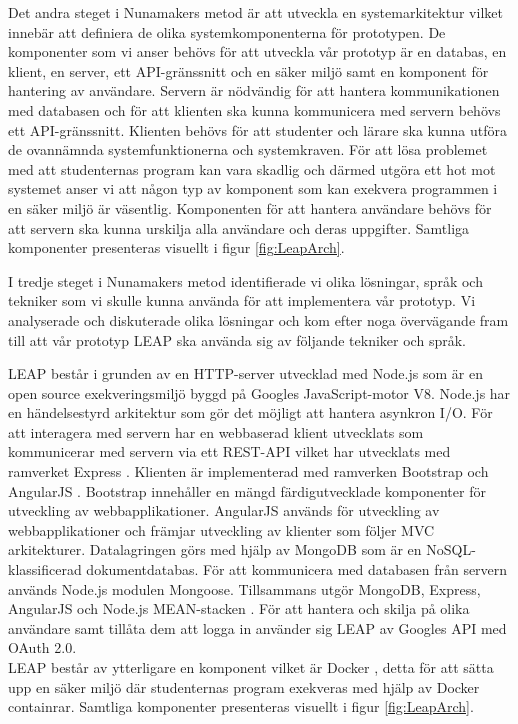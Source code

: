 \documentclass[a4paper,11pt]{article}
\begin{document}
{Det andra steget i Nunamakers metod är att utveckla en systemarkitektur vilket innebär att definiera de olika systemkomponenterna för prototypen. De komponenter som vi anser behövs för att utveckla vår prototyp är en databas,  en klient, en server, ett API-gränssnitt och en säker miljö samt en komponent för hantering av användare. Servern är nödvändig för att hantera kommunikationen med databasen och för att klienten ska kunna kommunicera med servern behövs ett API-gränssnitt. Klienten behövs för att studenter och lärare ska kunna utföra de ovannämnda systemfunktionerna och systemkraven. För att lösa problemet med att studenternas program kan vara skadlig och därmed utgöra ett hot mot systemet anser vi att någon typ av komponent som kan exekvera programmen i en säker miljö är väsentlig. Komponenten för att hantera användare behövs för att servern ska kunna urskilja alla användare och deras uppgifter. Samtliga komponenter presenteras visuellt i figur \ref{fig:LeapArch}.

I tredje steget i Nunamakers metod identifierade vi olika lösningar, språk och tekniker som vi skulle kunna använda för att implementera vår prototyp. Vi analyserade och diskuterade olika lösningar och kom efter noga övervägande fram till att vår prototyp LEAP ska använda sig av följande tekniker och språk. 

LEAP består i grunden av en HTTP-server utvecklad med Node.js \cite{nodejs} som är en open source exekveringsmiljö byggd på Googles JavaScript-motor V8. Node.js har en händelsestyrd arkitektur som gör det möjligt att hantera asynkron I/O. För att interagera med servern har en webbaserad klient utvecklats som kommunicerar med servern via ett REST-API vilket har utvecklats med ramverket Express \cite{express}. Klienten är implementerad med ramverken Bootstrap \cite{bootstrap} och AngularJS \cite{angularjs}. Bootstrap innehåller en mängd färdigutvecklade komponenter för utveckling av webbapplikationer. AngularJS används för utveckling av webbapplikationer och främjar utveckling av klienter som följer MVC arkitekturer. Datalagringen görs med hjälp av MongoDB \cite{mongodb} som är en NoSQL-klassificerad dokumentdatabas. För att kommunicera med databasen från servern används Node.js modulen Mongoose.  Tillsammans utgör MongoDB, Express, AngularJS och Node.js MEAN-stacken \cite{mean_stack}. För att hantera och skilja på olika användare samt tillåta dem att logga in använder sig LEAP av Googles API med OAuth 2.0.
\\
LEAP består av ytterligare en komponent vilket är Docker \cite{docker}, detta för att sätta upp en säker miljö där studenternas program exekveras med hjälp av Docker containrar. Samtliga komponenter presenteras visuellt i figur \ref{fig:LeapArch}.

}
\end{document}
